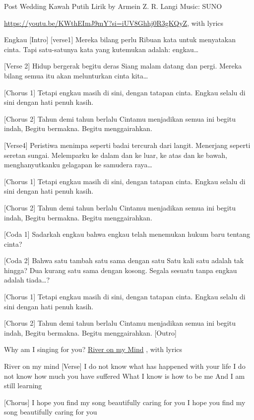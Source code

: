 \documentclass[
  letterpaper,
  DIV=11,
  numbers=noendperiod]{scrreprt}
\begin{document}
Post Wedding Kawah Putih Lirik by Armein Z. R. Langi Music: SUNO

\url{https://youtu.be/KWthEImJ9mY?si=iUV8Ghhj0R3gKQyZ}, with lyrics

Engkau {[}Intro{]} {[}verse1{]} Mereka bilang perlu Ribuan kata untuk
menyatakan cinta. Tapi satu-satunya kata yang kutemukan adalah:
engkau\ldots{}

{[}Verse 2{]} Hidup bergerak begitu deras Siang malam datang dan pergi.
Mereka bilang semua itu akan melunturkan cinta kita\ldots{}

{[}Chorus 1{]} Tetapi engkau masih di sini, dengan tatapan cinta. Engkau
selalu di sini dengan hati penuh kasih.

{[}Chorus 2{]} Tahun demi tahun berlalu Cintamu menjadikan semua ini
begitu indah, Begitu bermakna. Begitu menggairahkan.

{[}Verse4{]} Peristiwa menimpa seperti badai tercurah dari langit.
Menerjang seperti seretan sungai. Melemparku ke dalam dan ke luar, ke
atas dan ke bawah, menghanyutkanku gelagapan ke samudera raya\ldots{}

{[}Chorus 1{]} Tetapi engkau masih di sini, dengan tatapan cinta. Engkau
selalu di sini dengan hati penuh kasih.

{[}Chorus 2{]} Tahun demi tahun berlalu Cintamu menjadikan semua ini
begitu indah, Begitu bermakna. Begitu menggairahkan.

{[}Coda 1{]} Sadarkah engkau bahwa engkau telah menemukan hukum baru
tentang cinta?

{[}Coda 2{]} Bahwa satu tambah satu sama dengan satu Satu kali satu
adalah tak hingga? Dua kurang satu sama dengan kosong. Segala sesuatu
tanpa engkau adalah tiada\ldots?

{[}Chorus 1{]} Tetapi engkau masih di sini, dengan tatapan cinta. Engkau
selalu di sini dengan hati penuh kasih.

{[}Chorus 2{]} Tahun demi tahun berlalu Cintamu menjadikan semua ini
begitu indah, Begitu bermakna. Begitu menggairahkan. {[}Outro{]}

Why am I singing for you? \href{./Rivers\%20In\%20My\%20Mind.mp3}{River
on my Mind} , with lyrics

River on my mind {[}Verse{]} I do not know what has happened with your
life I do not know how much you have suffered What I know is how to be
me And I am still learning

{[}Chorus{]} I hope you find my song beautifully caring for you I hope
you find my song beautifully caring for you
\end{document}
